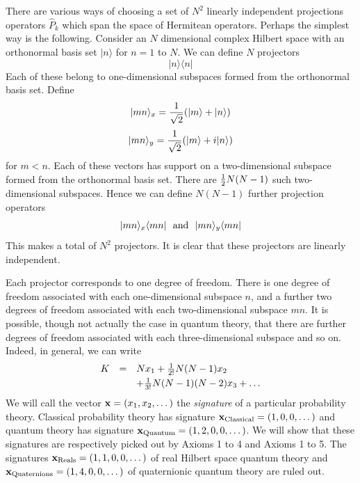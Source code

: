 \documentclass[12pt]{article}
\begin{document}
There are various ways of choosing a set of $N^2$ linearly independent
projections operators $\hat{ P}_k$ which span the space of Hermitean
operators.  Perhaps the simplest way is the following. Consider an $N$
dimensional complex Hilbert space with an orthonormal basis set
$|n\rangle$ for $n=1$ to $N$.  We can define $N$ projectors
\begin{equation}\label{nbasis}
     |n\rangle\langle n|
\end{equation}
Each of these belong to one-dimensional subspaces formed from the
orthonormal basis set.  Define
\[ |mn\rangle_x={1\over\sqrt{2}}(|m\rangle + |n\rangle) \]
\[ |mn\rangle_y={1\over\sqrt{2}}(|m\rangle + i|n\rangle) \]
for $m < n$.  Each of these vectors has support on a two-dimensional
subspace formed from the orthonormal basis set.  There are ${1\over 2}
N(N-1)$ such two-dimensional subspaces.  Hence we can define
$N(N-1)$ further projection operators
\begin{equation}\label{mpmn}
 |mn\rangle_x\langle mn| ~~{\rm and}~~ |mn\rangle_y\langle mn|
\end{equation}
This makes a total of $N^2$ projectors. It is clear that these
projectors are linearly independent.

Each projector corresponds to one degree of freedom.  There is one
degree of freedom associated with each one-dimensional subspace $n$, and a
further two degrees of freedom associated with each two-dimensional
subspace $mn$.  It is possible, though not actually the case in quantum
theory, that there are further
degrees of freedom associated with each three-dimensional subspace and
so on.  Indeed, in general, we can write
\begin{equation}
\begin{array}{rcl}
K &= & Nx_1 + {1\over 2!}N(N-1)x_2 \\[3pt]
{} & {} &+ {1\over3!}N(N-1)(N-2)x_3 + \dots
\end{array}
\end{equation}
We will call the vector ${\bf x}=(x_1,x_2,\dots)$ the {\it signature} of
a particular probability theory.  Classical probability theory has
signature ${\bf x}_{\rm Classical}=(1,0,0,\dots)$ and quantum theory has
signature ${\bf x}_{\rm Quantum}=(1,2,0,0,\dots)$.  We will show that
these signatures are respectively picked out by Axioms 1 to 4 and Axioms
1 to 5.  The signatures ${\bf x}_{\rm Reals}=(1,1,0,0,\dots)$ of real
Hilbert space quantum theory and ${\bf x}_{\rm
Quaternions}=(1,4,0,0,\dots)$ of quaternionic quantum theory are ruled out.
\end{document}
